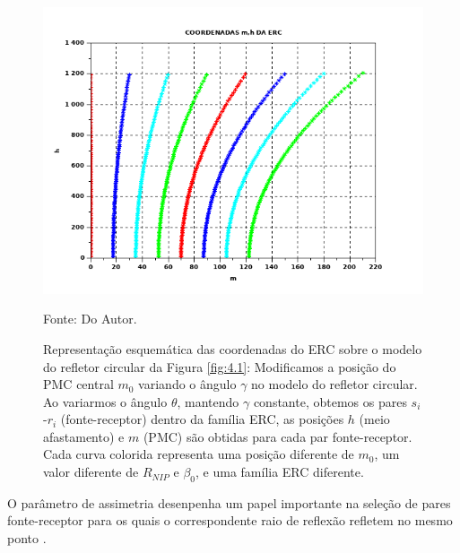 \begin{figure}[htb]
\caption{Representação esquemática das coordenadas do ERC sobre o modelo do refletor circular da Figura \ref{fig:4.1}:
Modificamos a posição do PMC central $m_0$ variando o ângulo $\gamma$ no modelo do refletor circular.
Ao variarmos o ângulo $\theta$, mantendo $\gamma$ constante, obtemos os pares $s_i$-$r_i$ (fonte-receptor)
dentro da família
ERC, as posições $h$ (meio afastamento) e $m$ (PMC) são obtidas para cada par fonte-receptor.
Cada curva colorida representa uma posição
diferente de $m_0$, um valor diferente de $R_{NIP}$ e $\beta_0$, e uma família ERC diferente.}
\begin{center}
\includegraphics[scale=0.5]{images/coordenadas_CRE.png}
\vspace{-0.3cm}
\end{center}
\begin{center}
 Fonte: Do Autor.
\end{center}
\label{fig:4.2}
\end{figure}





O parâmetro de assimetria desenpenha um papel importante na seleção de pares fonte-receptor para os quais
o correspondente raio de reflexão refletem no mesmo ponto \cite{tygel}.


